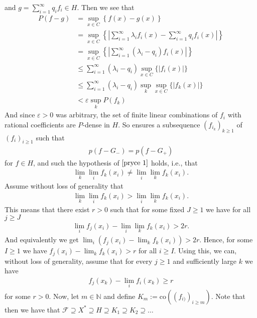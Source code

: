 \documentclass[10pt,twoside,openany,final]{memoir}
\theoremstyle{break}
\theoremstyle{Break}
\newcommand{\N}{\mathbb{N}}
\begin{document}
and $g=\sum_{i=1}^\infty q_{i}f_{i} \in H$.
Then we see that
\begin{align*}
P(f-g)&=\sup_{x\in C}\left\{ f(x)-g(x) \right\}\\
&= \sup_{x \in C} \left\{\left|\sum_{i=1}^\infty \lambda_{i} f_{i}(x) - \sum_{i=1}^\infty q_{i} f_{i}(x)\right| \right\}\\
&=\sup_{x \in C} \left\{ \left| \sum_{i=1}^\infty(\lambda_{i} -q_{i}) f_{i}(x) \right| \right\}\\
&\leq \sum_{i=1}^\infty (\lambda_{i} - q_{i}) \sup_{x \in C} \{|f_{i}(x)|\}\\
&\leq \sum_{i=1}^\infty (\lambda_{i} - q_{i})\sup_{k}\sup_{x\in C} \{|f_{k}(x)|\}\\
&< \varepsilon \sup_{k}P(f_{k})
\end{align*}
And since $\varepsilon>0$ was arbitrary, the set of finite linear combinations of $f_{i}$ with rational coefficients are $P$-dense in $H$. So  ensures a subsequence $(f_{i_{k}})_{k\geq 1}$ of $(f_{i})_{i \geq 1}$ such that 
\begin{align*}
p(f-G_{-})=p(f-G_{+})
\end{align*}
for $f \in H$, and such the hypothesis of $\Cref{pryce 1}$ holds, i.e., that
\begin{align*}
\lim_{k}\lim_{i}f_{k}(x_{i}) \neq \lim_{i} \lim_{k}f_{k}(x_{i}).
\end{align*}
Assume without loss of generality that 
\begin{align*}
\lim_{k}\lim_{i}f_{k}(x_{i}) > \lim_{i} \lim_{k}f_{k}(x_{i}).
\end{align*}
This means that there exist $r>0$ such that for some fixed $J \geq 1$ we have for all $j\geq J$
\begin{align*}
\lim_{i}f_{j}(x_{i}) - \lim_{i} \lim_{k}f_{k}(x_{i})>2r.
\end{align*}
And equivalently we get $\displaystyle \lim_{i}\left(f_{j}(x_{i}) - \lim_{k}f_{k}(x_{i})\right)>2r$.
Hence, for some $I\geq 1$ we have $\displaystyle f_{j}(x_{i}) - \lim_{k}f_{k}(x_{i})>r$ for all $i\geq I$.
Using this, we can, without loss of generality, assume that for every $j\geq 1$ and sufficiently large $k$  we have
\begin{align*}
f_{j}(x_{k})-\lim_{i} f_{i}(x_{k}) \geq r
\end{align*} 
for some $r>0$. Now, let $m \in \N$ and define $K_{m}:=\text{co}\left((f_{i)})_{i \geq m} \right)$. Note that then we have that $\mathcal{F} \supseteq X^*\supseteq H \supseteq K_{1} \supseteq K_{2} \supseteq \dots $
\end{document}
